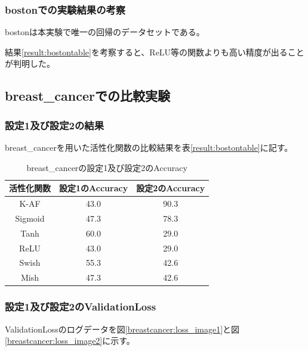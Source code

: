 \subsubsection{bostonでの実験結果の考察}
bostonは本実験で唯一の回帰のデータセットである。

結果\ref{result:bostontable}を考察すると、ReLU等の関数よりも高い精度が出ることが判明した。





\subsection{breast\_cancerでの比較実験}
\label{ev:breastcancer}

\subsubsection{設定1及び設定2の結果}

breast\_cancerを用いた活性化関数の比較結果を表\ref{result:bostontable}に記す。


\begin{table}[htbp]
    \begin{center}
        \caption{breast\_cancerの設定1及び設定2のAccuracy}
        \label{result:breastcancer}
        \vspace{2mm} 
        \begin{tabular}{|c|c|c|}
            \hline
            活性化関数              & 設定1のAccuracy &  設定2のAccuracy \\
            \hline
            K-AF            & 43.0 & 90.3 \\
            \hline
            Sigmoid            & 47.3 & 78.3\\
            \hline
            Tanh            & 60.0 & 29.0\\
            \hline
            ReLU        & 43.0 & 29.0\\
            \hline
            Swish           & 55.3 & 42.6\\
            \hline
            Mish           & 47.3 & 42.6\\
            \hline
        \end{tabular}
    \end{center}
\end{table}




\subsubsection{設定1及び設定2のValidationLoss}
\label{breastcancer:loss}
ValidationLossのログデータを図\ref{breastcancer:loss_image1}と図\ref{breastcancer:loss_image2}に示す。


